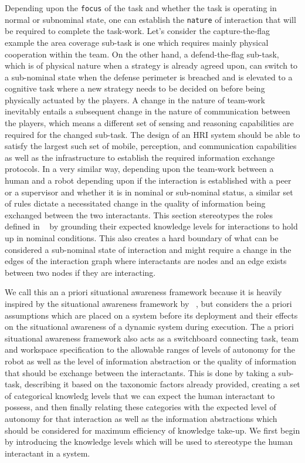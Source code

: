 \documentclass[letterpaper, 10 pt, conference]{ieeeconf} %
\theoremstyle{definition} \newtheorem{definition}{Definition}
\newcommand{\citet}[1]{\citeauthor{#1}~\cite{#1}}
\begin{document}
Depending upon the \texttt{focus} of the task and whether the task is operating
in normal or subnominal state, one can establish the \texttt{nature} of
interaction that will be required to complete the task-work. Let's consider the
capture-the-flag example the area coverage sub-task is one which requires mainly
physical cooperation within the team. On the other hand, a defend-the-flag
sub-task, which is of physical nature when a strategy is already agreed upon,
can switch to a sub-nominal state when the defense perimeter is breached and is
elevated to a cognitive task where a new strategy needs to be decided on before
being physically actuated by the players. A change in the nature of team-work
inevitably entails a subsequent change in the nature of communication between
the players, which means a different set of sensing and reasoning capabilities
are required for the changed sub-task. The design of an HRI system should be
able to satisfy the largest such set of mobile, perception, and communication
capabilities as well as the infrastructure to establish the required information
exchange protocols. In a very similar way, depending upon the team-work between
a human and a robot depending upon if the interaction is established with a peer
or a supervisor and whether it is in nominal or sub-nominal status, a similar
set of rules dictate a necessitated change in the quality of information being
exchanged between the two interactants. This section stereotypes the roles
defined in \citet{Goodrich2007,Scholtz2003} by grounding their expected
knowledge levels for interactions to hold up in nominal conditions. This also
creates a hard boundary of what can be considered a sub-nominal state of
interaction and might require a change in the edges of the interaction graph
where interactants are nodes and an edge exists between two nodes if they are
interacting.

We call this an a priori situational awareness framework because it is heavily
inspired by the situational awareness framework by \citet{Endsley1995}, but
considers the a priori assumptions which are placed on a system before its
deployment and their effects on the situational awareness of a dynamic system
during execution. The a priori situational awareness framework also acts as a
switchboard connecting task, team and workspace specification to the allowable
ranges of levels of autonomy for the robot as well as the level of information
abstraction or the quality of information that should be exchange between the
interactants. This is done by taking a sub-task, describing it based on the
taxonomic factors already provided, creating a set of categorical knowledg
levels that we can expect the human interactant to possess, and then finally
relating these categories with the expected level of autonomy for that
interaction as well as the information abstractions which should be considered
for maximum efficiency of knowledge take-up. We first begin by introducing the
knowledge levels which will be used to stereotype the human interactant in a
system.
\end{document}
